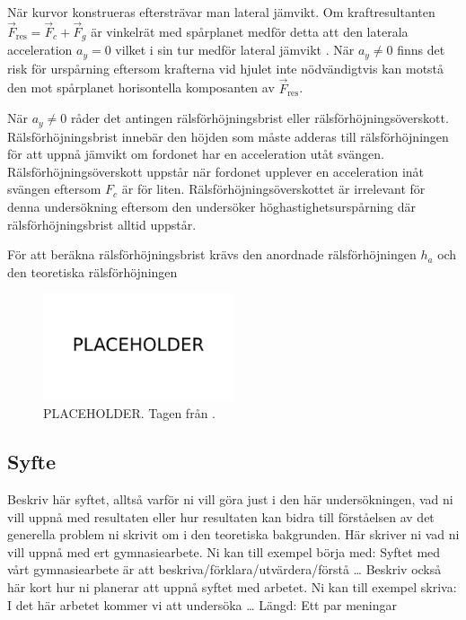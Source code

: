 När kurvor konstrueras eftersträvar man lateral jämvikt. Om kraftresultanten $\vec F_\mathrm{res} = \vec F_c + \vec F_g$ är vinkelrät med spårplanet medför detta att den laterala acceleration $a_y=0$ vilket i sin tur medför lateral jämvikt \parencite{carlos}. När $a_y\neq0$ finns det risk för urspårning eftersom krafterna vid hjulet inte nödvändigtvis kan motstå den mot spårplanet horisontella komposanten av $\vec F_\mathrm{res}$.

När $a_y\neq 0$ råder det antingen rälsförhöjningsbrist eller rälsförhöjningsöverskott. Rälsförhöjningsbrist innebär den höjden som måste adderas till rälsförhöjningen för att uppnå jämvikt om fordonet har en acceleration utåt svängen. Rälsförhöjningsöverskott uppstår när fordonet upplever en acceleration inåt svängen eftersom $F_c$ är för liten. Rälsförhöjningsöverskottet är irrelevant för denna undersökning eftersom den undersöker höghastighetsurspårning där rälsförhöjningsbrist alltid uppstår.

För att beräkna rälsförhöjningsbrist krävs den anordnade rälsförhöjningen $h_a$ och den teoretiska rälsförhöjningen


\begin{figure}[h]
    \centering
    \includegraphics[width=0.5\textwidth]{fig/placeholder.png}
    \caption{PLACEHOLDER. Tagen från \textcite{carlos}.}
    \label{fig:tågkrafter_doserad}
\end{figure}

\subsection{Syfte}
Beskriv här syftet, alltså varför ni vill göra just i den här undersökningen, vad ni vill uppnå med resultaten eller hur resultaten kan bidra till förståelsen av det generella problem ni skrivit om i den teoretiska bakgrunden. Här skriver ni vad ni vill uppnå med ert gymnasiearbete. Ni kan till exempel börja med: Syftet med vårt gymnasiearbete är att beskriva/förklara/utvärdera/förstå … Beskriv också här kort hur ni planerar att uppnå syftet med arbetet. Ni kan till exempel skriva: I det här arbetet kommer vi att undersöka …
Längd: Ett par meningar

